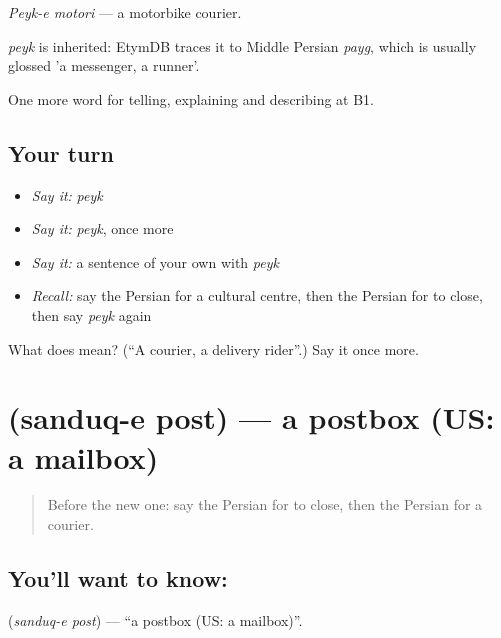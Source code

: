 \emph{Peyk-e motori} — a motorbike courier.

\begin{cousinweb}
\emph{peyk} is inherited: EtymDB traces it to Middle Persian \emph{payg}, which is usually glossed 'a messenger, a runner'.
\end{cousinweb}

\begin{grammarlens}[title={What you've built}]
One more word for telling, explaining and describing at B1.
\end{grammarlens}

\subsection*{Your turn}
\begin{itemize}
\raggedright
  \item \emph{Say it:} \emph{peyk}
  \item \emph{Say it:} \emph{peyk}, once more
  \item \emph{Say it:} a sentence of your own with \emph{peyk}
  \item \emph{Recall:} say the Persian for a cultural centre, then the Persian for to close, then say \emph{peyk} again
\end{itemize}

\begin{tcolorbox}[breakable,colback=teal!4,colframe=teal!35!black,title={Before you move on}]
What does  mean? (\textquotedblleft{}A courier, a delivery rider\textquotedblright{}.) Say it once more.
\end{tcolorbox}
\section[\texorpdfstring{\fa{صندوق} \fa{پست} (sanduq-e post)}{صندوق پست (sanduq-e post)}]{  (sanduq-e post) — a postbox (US: a mailbox)}

\label{lesson:FA-C456-sanduq-e-post}



\begin{quote}
Before the new one: say the Persian for to close, then the Persian for a courier.
\end{quote}

\subsection*{You'll want to know:  }
\textbf{ } (\emph{sanduq-e post}) — \textquotedblleft{}a postbox (US: a mailbox)\textquotedblright{}.

